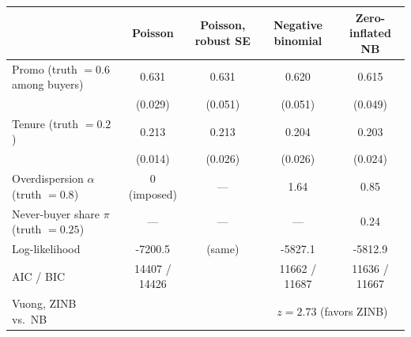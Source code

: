 \begin{tabular}{lcccc}\toprule
 & Poisson & Poisson, robust SE & Negative binomial & Zero-inflated NB \\ \midrule
Promo (truth $= 0.6$ among buyers) & 0.631 & 0.631 & 0.620 & 0.615 \\
 & (0.029) & (0.051) & (0.051) & (0.049) \\
Tenure (truth $= 0.2$) & 0.213 & 0.213 & 0.204 & 0.203 \\
 & (0.014) & (0.026) & (0.026) & (0.024) \\
Overdispersion $\alpha$ (truth $= 0.8$) & 0 (imposed) & --- & 1.64 & 0.85 \\
Never-buyer share $\pi$ (truth $= 0.25$) & --- & --- & --- & 0.24 \\
Log-likelihood & -7200.5 & (same) & -5827.1 & -5812.9 \\
AIC / BIC & 14407 / 14426 & & 11662 / 11687 & 11636 / 11667 \\
Vuong, ZINB vs.\ NB & & & \multicolumn{2}{c}{$z = 2.73$ (favors ZINB)}  \\
\bottomrule\end{tabular}
